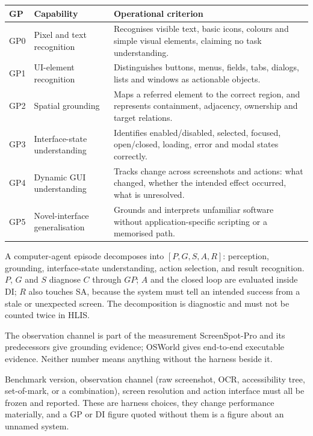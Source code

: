 \documentclass[11pt]{article}
\theoremstyle{definition}
\begin{document}
\begin{table}[h]
\centering\small
\begin{tabularx}{\textwidth}{@{}llY@{}}
\toprule
GP & Capability & Operational criterion \\
\midrule
GP0 & Pixel and text recognition & Recognises visible text, basic icons, colours and simple visual elements, claiming no task understanding. \\
GP1 & UI-element recognition & Distinguishes buttons, menus, fields, tabs, dialogs, lists and windows as actionable objects. \\
GP2 & Spatial grounding & Maps a referred element to the correct region, and represents containment, adjacency, ownership and target relations. \\
GP3 & Interface-state understanding & Identifies enabled/disabled, selected, focused, open/closed, loading, error and modal states correctly. \\
GP4 & Dynamic GUI understanding & Tracks change across screenshots and actions: what changed, whether the intended effect occurred, what is unresolved. \\
GP5 & Novel-interface generalisation & Grounds and interprets unfamiliar software without application-specific scripting or a memorised path. \\
\bottomrule
\end{tabularx}
\end{table}

A computer-agent episode decomposes into $[P, G, S, A, R]$: perception, grounding, interface-state understanding, action selection, and result recognition. $P$, $G$ and $S$ diagnose $C$ through $GP$; $A$ and the closed loop are evaluated inside DI; $R$ also touches SA, because the system must tell an intended success from a stale or unexpected screen. The decomposition is diagnostic and must not be counted twice in HLIS.

\begin{cautionbox}{The observation channel is part of the measurement}
ScreenSpot-Pro \citep{li2025screenspotpro} and its predecessors give grounding evidence; OSWorld \citep{xie2024osworld} gives end-to-end executable evidence. Neither number means anything without the harness beside it.

Benchmark version, observation channel (raw screenshot, OCR, accessibility tree, set-of-mark, or a combination), screen resolution and action interface must all be frozen and reported. These are harness choices, they change performance materially, and a GP or DI figure quoted without them is a figure about an unnamed system.
\end{cautionbox}
\end{document}
